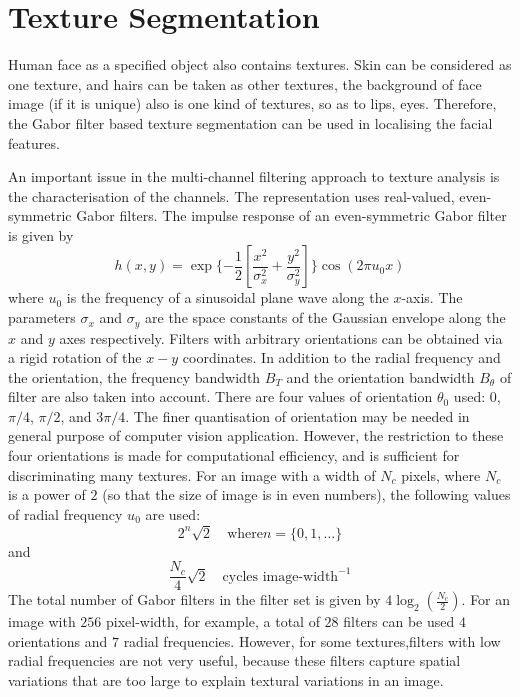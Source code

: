 \section{Texture Segmentation}
Human face as a specified object also contains textures. Skin can be considered as one  texture, and hairs can be taken as other textures, the background of face image (if it is unique) also is one kind of textures, so as to lips, eyes. Therefore, the Gabor filter based texture segmentation can be used in localising the facial features. 

An important issue in the multi-channel filtering approach to texture analysis is the characterisation of the channels. The representation uses real-valued, even-symmetric Gabor filters. The impulse response of an even-symmetric Gabor filter is given by
\begin{equation}
 h(x,y)=\exp\{-\frac{1}{2} [\frac{x^2}{\sigma_x^2}+\frac{y^2}{\sigma_y^2}] \} \cos(2\pi u_0 x)
\end{equation}
where $u_0$ is the frequency of a sinusoidal plane wave along the $x$-axis. The parameters $\sigma_x$ and $\sigma_y$ are the space constants of the Gaussian envelope along the $x$ and $y$ axes respectively. Filters with arbitrary orientations can be obtained via a rigid rotation of the $x-y$ coordinates. In addition to the radial frequency and the orientation, the frequency bandwidth $B_T$ and the orientation bandwidth $B_{\theta}$ of filter are also taken into account. There are four values of orientation $\theta_0$ used: $0$, $\pi/4$, $\pi/2$, and $3\pi/4$. The finer quantisation of orientation may be needed in general purpose of computer vision application. However, the restriction to these four orientations is made for computational efficiency, and is sufficient for discriminating many textures. For an image with a width of $N_c$ pixels, where $N_c$ is a power of $2$ (so that the size of image is in even numbers), the following values of radial frequency $u_0$ are used:
\begin{displaymath}
2^n \sqrt{2} \quad \textrm{where} n = \{0,1,\ldots\}
\end{displaymath}
and
\begin{displaymath}
 \frac{N_c}{4}\sqrt{2} \quad \textrm{cycles image-width}^{-1}
\end{displaymath}
The total number of Gabor filters in the filter set is given by $4\log_2(\frac{N_c}{2})$. For an image with $256$ pixel-width, for example, a total of $28$ filters can be used $4$ orientations and $7$ radial frequencies. However, for some textures,filters with low radial frequencies are not very useful, because these filters capture spatial variations that are too large to explain textural variations in an image.

